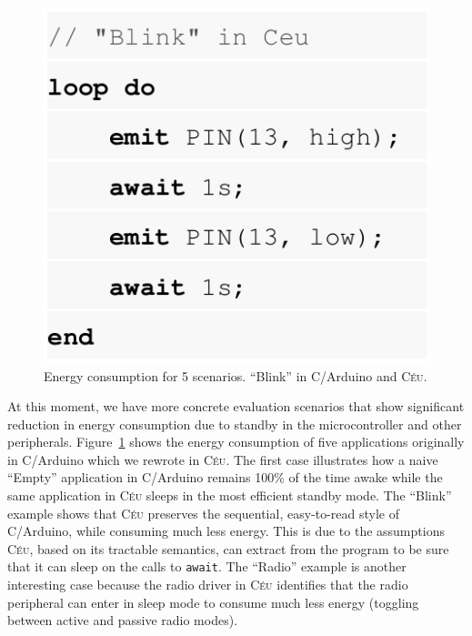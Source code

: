 \documentclass[12pt,english]{amsart}
\newcommand{\CEU}{\textsc{C\'{e}u}\xspace}
\newcommand{\code}[1] {{\small{\texttt{#1}}}}
\begin{document}
\begin{figure}
\begin{minipage}{0.28\textwidth}
\includegraphics[width=\linewidth]{blink_ceu}
\end{minipage}
\caption{ Energy consumption for 5 scenarios.
          ``Blink'' in C/Arduino and \CEU.
\label{lst.eval}
}
\end{figure}

At this moment, we have more concrete evaluation scenarios that show
significant reduction in energy consumption due to standby in the
microcontroller and other peripherals.
%
Figure~\ref{lst.eval} shows the energy consumption of five applications
originally in C/Arduino which we rewrote in \CEU.
%
The first case illustrates how a naive ``Empty'' application in C/Arduino
remains 100\% of the time awake while the same application in \CEU sleeps in
the most efficient standby mode.
%
The ``Blink'' example shows that \CEU preserves the sequential, easy-to-read
style of C/Arduino, while consuming much less energy.
This is due to the assumptions \CEU, based on its tractable semantics, can
extract from the program to be sure that it can sleep on the calls to
\code{await}.
%
The ``Radio'' example is another interesting case because the radio driver in
\CEU identifies that the radio peripheral can enter in sleep mode to consume
much less energy (toggling between active and passive radio modes).
\end{document}
